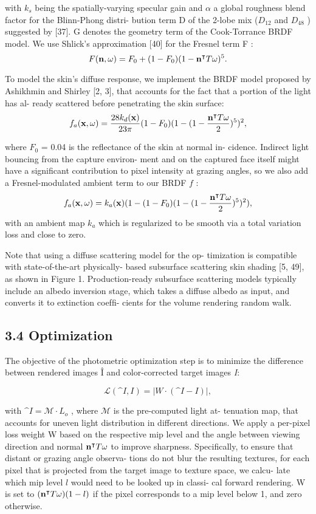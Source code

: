 \documentclass[twocolumn]{article}
\date{}
\title{}
\author{}
\begin{document}
\noindent with ${k}_{s}$ being the spatially-varying specular gain and $\alpha$ a
global roughness blend factor for the Blinn-Phong distri-
bution term D of the 2-lobe mix (${D}_{12}$ and ${D}_{48}$ ) suggested
by [37]. G denotes the geometry term of the Cook-Torrance
BRDF model. We use Shlick’s approximation [40] for the
Fresnel term F :
$$
F({\bf n},\omega) = {F}_{0} + (1 - {F}_{0})(1-{{\bf n}}^\intercal T \omega)^5.
$$

To model the skin’s diffuse response, we implement the
BRDF model proposed by Ashikhmin and Shirley [2, 3],
that accounts for the fact that a portion of the light has al-
ready scattered before penetrating the skin surface:
$$
{f}_{a}({\bf x},\omega) = \frac{28{k}_{d}({\bf x})}{23\pi}(1 - {F}_{0})(1 - (1 - \frac{{\bf n}^\intercal T \omega}{2})^5)^2,
$$

where ${F}_{0}$ = 0.04 is the reﬂectance of the skin at normal in-
cidence. Indirect light bouncing from the capture environ-
ment and on the captured face itself might have a signiﬁcant
contribution to pixel intensity at grazing angles, so we also
add a Fresnel-modulated ambient term to our BRDF $f$ :
$$
{f}_{a}({\bf x},\omega) = {k}_{a}({\bf x})(1 - (1 - {F}_{0})(1 - (1 - \frac{{\bf n}^\intercal T \omega}{2})^5)^2),
$$
with an ambient map ${k}_{a}$ which is regularized to be smooth
via a total variation loss and close to zero.

\indent Note that using a diffuse scattering model for the op-
timization is compatible with state-of-the-art physically-
based subsurface scattering skin shading [5, 49], as shown
in Figure 1. Production-ready subsurface scattering models
typically include an albedo inversion stage, which takes a
diffuse albedo as input, and converts it to extinction coefﬁ-
cients for the volume rendering random walk.

\subsection*{3.4 Optimization}\label{3.4}

The objective of the photometric optimization step is to
minimize the difference between rendered images \^I and
color-corrected target images \textit{I}:

$$
\mathcal{L}(\^I,I) =  |W \cdot (\^I - I)|,
$$

with $\^I = \mathcal{M} \cdot {L}_{o}$ , where $\mathcal{M}$ is the pre-computed light at-
tenuation map, that accounts for uneven light distribution
in different directions. We apply a per-pixel loss weight
W based on the respective mip level and the angle between
viewing direction and normal ${\bf n}^\intercal T \omega$ to improve sharpness.
Speciﬁcally, to ensure that distant or grazing angle observa-
tions do not blur the resulting textures, for each pixel that is
projected from the target image to texture space, we calcu-
late which mip level $l$ would need to be looked up in classi-
cal forward rendering. W is set to $({\bf n}^\intercal T \omega)(1 - l)$ if the pixel
corresponds to a mip level below 1, and zero otherwise.
\end{document}
